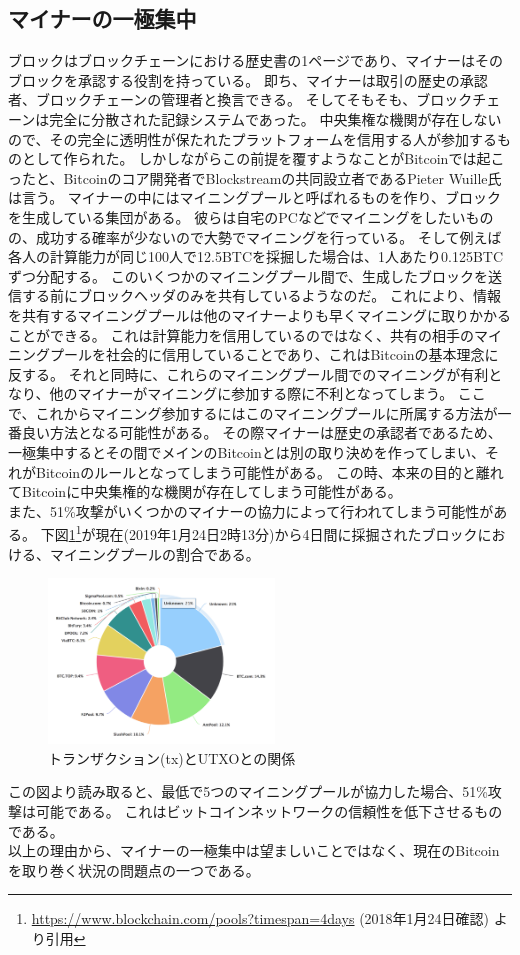 \subsection{マイナーの一極集中}
ブロックはブロックチェーンにおける歴史書の1ページであり、マイナーはそのブロックを承認する役割を持っている。
即ち、マイナーは取引の歴史の承認者、ブロックチェーンの管理者と換言できる。
そしてそもそも、ブロックチェーンは完全に分散された記録システムであった。
中央集権な機関が存在しないので、その完全に透明性が保たれたプラットフォームを信用する人が参加するものとして作られた。
しかしながらこの前提を覆すようなことがBitcoinでは起こったと、Bitcoinのコア開発者でBlockstreamの共同設立者であるPieter Wuille氏は言う。
マイナーの中にはマイニングプールと呼ばれるものを作り、ブロックを生成している集団がある。
彼らは自宅のPCなどでマイニングをしたいものの、成功する確率が少ないので大勢でマイニングを行っている。
そして例えば各人の計算能力が同じ100人で12.5BTCを採掘した場合は、1人あたり0.125BTCずつ分配する。
このいくつかのマイニングプール間で、生成したブロックを送信する前にブロックヘッダのみを共有しているようなのだ。
これにより、情報を共有するマイニングプールは他のマイナーよりも早くマイニングに取りかかることができる。
これは計算能力を信用しているのではなく、共有の相手のマイニングプールを社会的に信用していることであり、これはBitcoinの基本理念に反する。
それと同時に、これらのマイニングプール間でのマイニングが有利となり、他のマイナーがマイニングに参加する際に不利となってしまう。
ここで、これからマイニング参加するにはこのマイニングプールに所属する方法が一番良い方法となる可能性がある。
その際マイナーは歴史の承認者であるため、一極集中するとその間でメインのBitcoinとは別の取り決めを作ってしまい、それがBitcoinのルールとなってしまう可能性がある。
この時、本来の目的と離れてBitcoinに中央集権的な機関が存在してしまう可能性がある。 \\
また、51\%攻撃がいくつかのマイナーの協力によって行われてしまう可能性がある。
下図\ref{MiningPool}\footnote{\url{https://www.blockchain.com/pools?timespan=4days} (2018年1月24日確認) より引用}が現在(2019年1月24日2時13分)から4日間に採掘されたブロックにおける、マイニングプールの割合である。
\begin{figure}[htbp]
 \centering
  \includegraphics[width=60mm]{image/MiningPool.png}
 \caption{トランザクション(tx)とUTXOとの関係}
 \label{MiningPool}
\end{figure}
この図より読み取ると、最低で5つのマイニングプールが協力した場合、51\%攻撃は可能である。
これはビットコインネットワークの信頼性を低下させるものである。 \\
以上の理由から、マイナーの一極集中は望ましいことではなく、現在のBitcoinを取り巻く状況の問題点の一つである。

